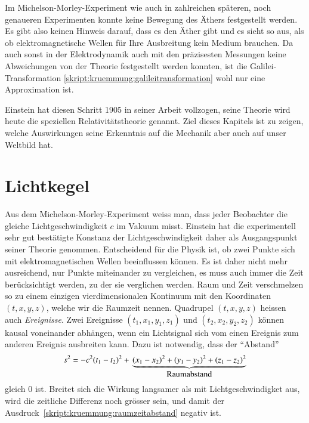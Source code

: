 Im Michelson-Morley-Experiment wie auch in zahlreichen späteren, noch
genaueren Experimenten konnte keine Bewegung des Äthers festgestellt
werden.
Es gibt also keinen Hinweis darauf, dass es den Äther gibt und es
sieht so aus, als ob elektromagnetische Wellen für Ihre Ausbreitung
kein Medium brauchen.
Da auch sonst in der Elektrodynamik auch mit den präzisesten Messungen
keine Abweichungen von der Theorie festgestellt werden konnten,
ist die Galilei-Transformation
\eqref{skript:kruemmung:galileitransformation} wohl nur eine
Approximation ist.

Einstein hat diesen Schritt 1905 in seiner Arbeit \cite{skript:einstein}
vollzogen, seine Theorie wird heute die speziellen Relativitätstheorie genannt.
Ziel dieses Kapitels ist zu zeigen, welche Auswirkungen seine
Erkenntnis auf die Mechanik aber auch auf unser Weltbild hat.

\section{Lichtkegel}
\label{chap:lichtkegel}
Aus dem Michelson-Morley-Experiment weiss man, dass jeder Beobachter
die gleiche Lichtgeschwindigkeit $c$ im Vakuum misst.
Einstein hat die experimentell sehr gut bestätigte Konstanz der
Lichtgeschwindigkeit daher als Ausgangspunkt seiner Theorie genommen.
Entscheidend für die Physik ist, ob zwei Punkte sich mit elektromagnetischen
Wellen beeinflussen können.
Es ist daher nicht mehr ausreichend, nur Punkte miteinander zu vergleichen,
es muss auch immer die Zeit berücksichtigt werden, zu der sie verglichen
werden.
Raum und Zeit verschmelzen so zu einem einzigen vierdimensionalen
Kontinuum mit den Koordinaten $(t,x,y,z)$, welche wir die Raumzeit
nennen.
Quadrupel $(t,x,y,z)$ heissen auch {\em Ereignisse}.
Zwei Ereignisse $(t_1,x_1,y_1,z_1)$ und $(t_2,x_2,y_2,z_2)$ können
kausal voneinander abhängen, wenn ein Lichtsignal sich vom einen Ereignis
zum anderen Ereignis ausbreiten kann.
Dazu ist notwendig, dass der ``Abstand''
\begin{equation}
s^2
=
-c^2(t_1-t_2)^2
+
\mathstrut
\underbrace{
(x_1-x_2)^2
+
(y_1-y_2)^2
+
(z_1-z_2)^2}_{\displaystyle\text{Raumabstand}}
\label{skript:kruemmung:raumzeitabstand}
\end{equation}
gleich $0$ ist.
Breitet sich die Wirkung langsamer als mit Lichtgeschwindigket aus,
wird die zeitliche Differenz noch grösser sein, und damit der
Ausdruck~\eqref{skript:kruemmung:raumzeitabstand} negativ ist.

